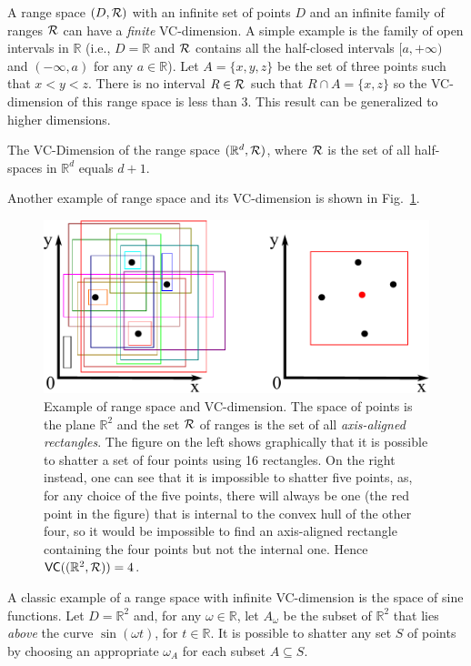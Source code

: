 A range space $(D,\mathcal{R})$ with an infinite set of points $D$ and
an infinite family of ranges $\mathcal{R}$ can have a \emph{finite} VC-dimension. A simple
example is the family of open intervals in $\mathbb{R}$ (i.e., $D=\mathbb{R}$ and $\mathcal{R}$
contains all the half-closed intervals $[a,+\infty)$ and $(-\infty, a)$ for any
$a\in\mathbb{R}$). Let $A=\{x,y,z\}$ be the set of three points such that
$x<y<z$. There is no interval $R\in\mathcal{R}$ such that $R\cap A=\{x,z\}$ so the
VC-dimension of this range space is less than 3. This result can be generalized
to higher dimensions.  
\begin{lemma}\label{lem:matousek} The
  VC-Dimension of the range
  space $(\mathbb{R}^d, \mathcal{R})$, where $\mathcal{R}$ is the set of all half-spaces
  in $\mathbb{R}^d$ equals $d+1$.
\end{lemma}
Another example of range space and its VC-dimension is shown in Fig.~\ref{fig:rectangles}.

\begin{figure}[ht]
  \centering
  \includegraphics[width=.75\textwidth,keepaspectratio]{prelims/rectangles}
  \caption{Example of range space and VC-dimension. The space of points is the
  plane $\mathbb{R}^2$ and the set $\mathcal{R}$ of ranges is the set of all
  \emph{axis-aligned rectangles}. The figure on the left shows graphically that
  it is possible to shatter a set of four points using 16 rectangles. On the
  right instead, one can see that it is impossible to shatter five points, as,
  for any choice of the five points, there will always be one (the red point in
  the figure) that is internal to the convex hull of the other four, so it would
  be impossible to find an axis-aligned rectangle containing the four points
  but not the internal one. Hence $\mathsf{VC}((\mathbb{R}^2,\mathcal{R}))=4$.}
  \label{fig:rectangles}
\end{figure}

A classic example of a range space with infinite VC-dimension is the space of sine
functions. Let $D=\mathbb{R}^2$ and, for any $\omega\in\mathbb{R}$, let
$A_{\omega}$ be the subset of $\mathbb{R}^2$ that lies \emph{above} the
curve $\sin(\omega t)$, for $t\in \mathbb{R}$. It is possible to
shatter any set $S$ of points by choosing an appropriate $\omega_A$ for each
subset $A\subseteq S$.

